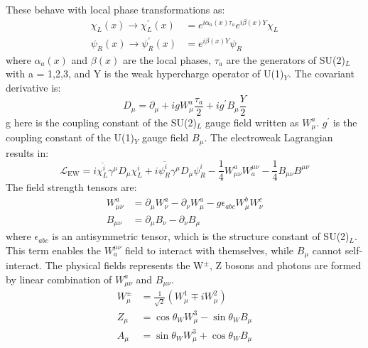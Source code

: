 These behave with local phase transformations as:
\begin{equation}
\begin{aligned}
\chi_{L}(x) \rightarrow \chi_{L}^{\prime}(x) &=e^{i \alpha_{a}(x) \tau_{a}} e^{i \beta(x) Y} \chi_{L} \\
\psi_{R}(x) \rightarrow \psi_{R}^{\prime}(x) &=e^{i \beta(x) Y} \psi_{R}
\end{aligned}
\end{equation}
where $\alpha_{a}(x)$ and $\beta(x)$ are the local phases, $\tau_{a}$ are the generators of SU(2)$_L$ with a = 1,2,3, and Y is the weak hypercharge operator of U(1)$_Y$. The covariant derivative is:
\begin{equation}
D_{\mu}=\partial_{\mu}+i g W_{\mu}^{a} \frac{\tau_{a}}{2}+i g^{\prime} B_{\mu} \frac{Y}{2}
\end{equation}
g here is the coupling constant of the SU(2)$_L$ gauge field written as $W_{\mu}^{a}$. $g^{\prime}$ is the coupling constant of the U(1)$_Y$ gauge field $B_{\mu}$.
The electroweak Lagrangian results in:
\begin{equation}
\mathcal{L}_{\mathrm{EW}}=i \overline{\chi_{L}^{i}} \gamma^{\mu} D_{\mu} \chi_{L}^{i}+i \overline{\psi_{R}^{i}} \gamma^{\mu} D_{\mu} \psi_{R}^{i}-\frac{1}{4} W_{\mu \nu}^{a} W_{a}^{\mu \nu}-\frac{1}{4} B_{\mu \nu} B^{\mu \nu}
\end{equation}
The field strength tensors are:
\begin{equation}
\begin{aligned}
W_{\mu \nu}^{a} &=\partial_{\mu} W_{\nu}^{a}-\partial_{\nu} W_{\mu}^{a}-g \epsilon_{a b c} W_{\mu}^{b} W_{\nu}^{c} \\
B_{\mu \nu} &=\partial_{\mu} B_{\nu}-\partial_{\nu} B_{\mu}
\end{aligned}
\end{equation}
where $\epsilon_{a b c}$ is an antisymmetric tensor, which is the structure constant of SU(2)$_L$. This term enables the $W_{a}^{\mu \nu}$ field to interact with themselves, while $B_{\mu}$ cannot self-interact.
The physical fields represents the W$^{\pm}$, Z bosons and photons are formed by linear combination of $W_{\mu \nu}^{a}$ and $B_{\mu \nu}$.
\begin{equation}
\begin{aligned}
W_{\mu}^{\pm} &=\frac{1}{\sqrt{2}}\left(W_{\mu}^{1} \mp i W_{\mu}^{2}\right) \\
Z_{\mu} &=\cos \theta_{W} W_{\mu}^{3}-\sin \theta_{W} B_{\mu} \\
A_{\mu} &=\sin \theta_{W} W_{\mu}^{3}+\cos \theta_{W} B_{\mu}
\end{aligned}
\end{equation}
